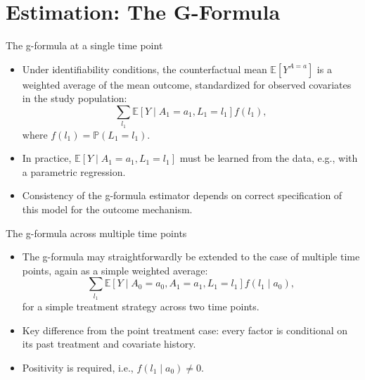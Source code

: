 \documentclass[ignorenonframetext,]{beamer}
\providecommand{\tightlist}{%
  \setlength{\itemsep}{0pt}\setlength{\parskip}{0pt}}
\newcommand{\E}{\mathbb{E}}
\newcommand{\pr}{\mathbb{P}}
\begin{document}
\hypertarget{estimation-the-g-formula}{%
\section{Estimation: The G-Formula}\label{estimation-the-g-formula}}

\begin{frame}{The g-formula at a single time point}
\protect\hypertarget{the-g-formula-at-a-single-time-point}{}

\begin{itemize}[<+->]
\tightlist
\item
  Under identifiability conditions, the counterfactual mean
  \(\E[Y^{A=a}]\) is a weighted average of the mean outcome,
  standardized for observed covariates in the study population:
  \[\sum_{l_1} \E[Y \mid A_1 = a_1, L_1 = l_1]f(l_1),\] where
  \(f(l_1) = \pr(L_1 = l_1)\).
\item
  In practice, \(\E[Y \mid A_1 = a_1, L_1 = l_1]\) must be learned from
  the data, e.g., with a parametric regression.
\item
  Consistency of the g-formula estimator depends on correct
  specification of this model for the outcome mechanism.
\end{itemize}

\end{frame}

\begin{frame}{The g-formula across multiple time points}
\protect\hypertarget{the-g-formula-across-multiple-time-points}{}

\begin{itemize}[<+->]
\tightlist
\item
  The g-formula may straightforwardly be extended to the case of
  multiple time points, again as a simple weighted average:
  \[\sum_{l_1} \E[Y \mid A_0 = a_0, A_1 = a_1, L_1 = l_1]f(l_1 \mid a_0),\]
  for a simple treatment strategy across two time points.
\item
  Key difference from the point treatment case: every factor is
  conditional on its past treatment and covariate history.
\item
  Positivity is required, i.e., \(f(l_1 \mid a_0) \neq 0\).
\end{itemize}

\end{frame}
\end{document}
